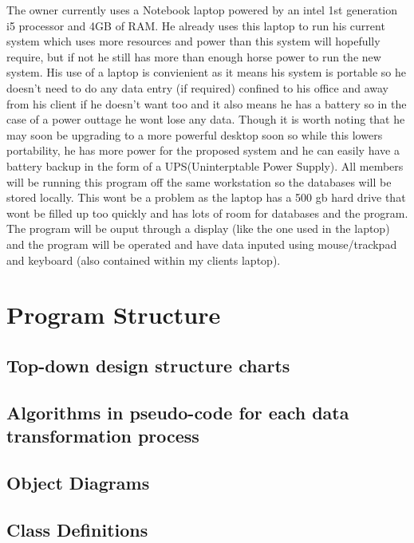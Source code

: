 The owner currently uses a Notebook laptop powered by an intel 1st generation
i5 processor and 4GB of RAM. He already uses this laptop to run his current
system which uses more resources and power than this system will hopefully
require, but if not he still has more than enough horse power to run the new
system. His use of a laptop is convienient as it means his system is portable
so he doesn’t need to do any data entry (if required) confined to his office and
away from his client if he doesn’t want too and it also means he has a battery so
in the case of a power outtage he wont lose any data. Though it is worth noting
that he may soon be upgrading to a more powerful desktop soon so while this
lowers portability, he has more power for the proposed system and he can easily
have a battery backup in the form of a UPS(Uninterptable Power Supply).
All members will be running this program off the same workstation so the
databases will be stored locally. This wont be a problem as the laptop has a 500 gb hard drive that wont be filled up too quickly and has lots of room for databases and the program. The program will be ouput through a display (like the one used in the laptop) and the program will be operated and have data inputed using mouse/trackpad and keyboard (also contained within my clients laptop). 



\section{Program Structure}

\subsection{Top-down design structure charts}

\subsection{Algorithms in pseudo-code for each data transformation process}

\subsection{Object Diagrams}

\subsection{Class Definitions}


